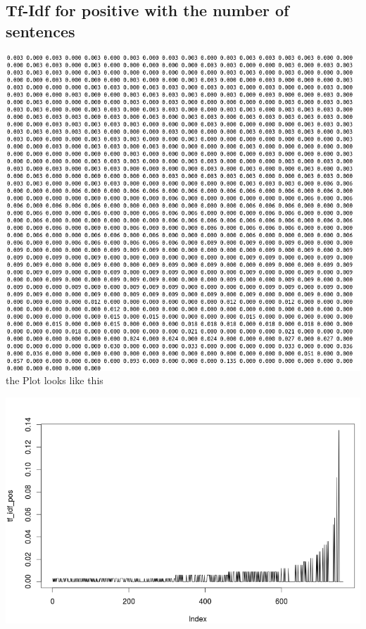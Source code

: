 \documentclass{article}
\begin{document}
\subsection{Tf-Idf for positive with the number of sentences}

\includegraphics[width=0.8\linewidth]{tf_idf_posusingsentence.png}\\
the Plot looks like this

\includegraphics[width=0.8\linewidth]{tf_idf_posusingsentenceplot.png}\\
\end{document}
